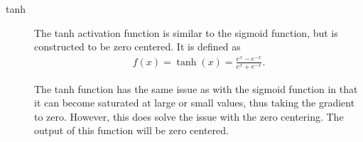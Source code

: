 \documentclass[10pt]{amsart}
\newenvironment{Figure}
{\par\medskip\noindent\minipage{\linewidth}}
{\endminipage\par\medskip}
\begin{document}
\begin{multicols}{2}
\begin{description}
    \item[tanh] The tanh activation function is similar to the sigmoid
      function, but is constructed to be zero centered. It is defined as
      \begin{align*}
        f(x)=\tanh(x)=\frac{e^x-e^{-x}}{e^x+e^{-x}}.
      \end{align*}
      \begin{Figure}
      \begin{center}
      \end{center}
      \label{fig:tanh}
      \end{Figure}
      The tanh function has the same issue as with the sigmoid function in that
      it can become saturated at large or small values, thus taking the
      gradient to zero. However, this does solve the issue with the zero
      centering. The output of this function will be zero centered.


\end{description}
\end{multicols}
\end{document}
